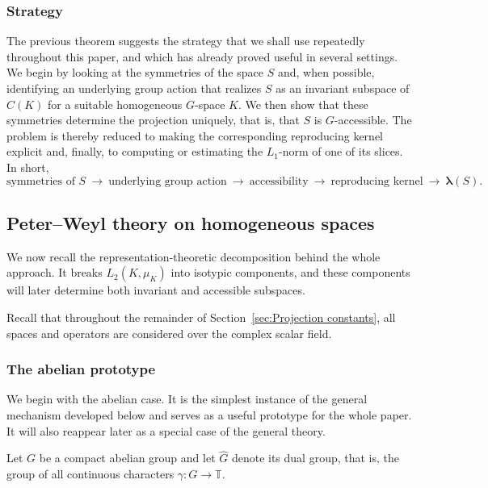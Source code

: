 \documentclass[11pt,showkeys]{amsart}
\begin{document}
\subsubsection{Strategy}
The previous theorem suggests the strategy that we shall use repeatedly
throughout this paper, and which has already proved useful in several
settings. We begin by looking at the symmetries of the space \(S\) and,
when possible, identifying an underlying group action that realizes
\(S\) as an invariant subspace of \(C(K)\) for a suitable homogeneous
\(G\)-space \(K\). We then show that these symmetries determine the
projection uniquely, that is, that \(S\) is \(G\)-accessible. The
problem is thereby reduced to making the corresponding reproducing
kernel explicit and, finally, to computing or estimating the
\(L_1\)-norm of one of its slices. In short,
\[
\text{symmetries of \(S\)}
\ \longrightarrow\
\text{underlying group action}
\ \longrightarrow\
\text{accessibility}
\ \longrightarrow\
\text{reproducing kernel}
\ \longrightarrow\
\boldsymbol\lambda(S).
\]




\subsection{Peter--Weyl theory on homogeneous spaces}
\label{sec:The Peter--Weyl decomposition}

We now recall the representation-theoretic decomposition behind the whole
approach. It breaks \(L_2(K,\mu_K)\) into isotypic components, and these
components will later determine both invariant and accessible subspaces.

Recall that throughout the remainder of Section~\ref{sec:Projection constants}, all spaces and operators are considered over the complex scalar field.


\subsubsection{The abelian prototype}

We begin with the abelian case. It is the simplest instance of the
general mechanism developed below and serves as a useful prototype for
the whole paper.  It will also reappear later as a special case of
the general theory.

Let \(G\) be a compact abelian group and let \(\widehat G\) denote its
dual group, that is, the group of all continuous characters
$     \gamma:G\longrightarrow\mathbb T .
$
\end{document}
